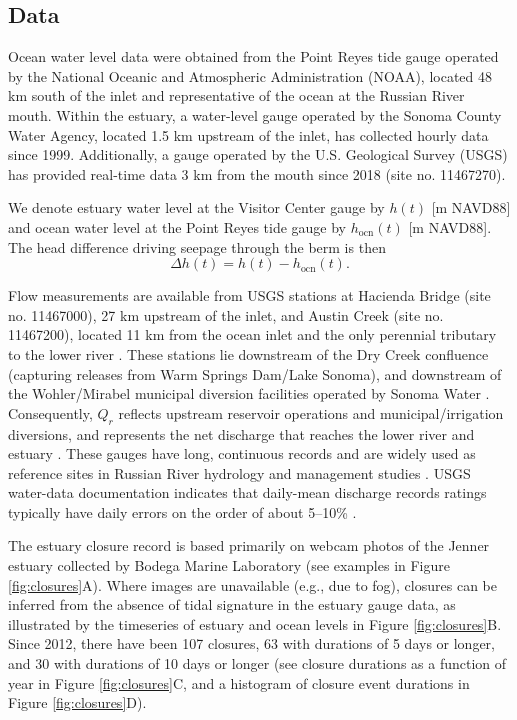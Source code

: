 \documentclass[preprint,12pt,authoryear]{elsarticle}
\begin{document}
\subsection{Data}

 Ocean water level data were obtained from the Point Reyes tide gauge operated by the National Oceanic and Atmospheric Administration (NOAA), located 48 km south of the inlet and representative of the ocean at the Russian River mouth. Within the estuary, a water-level gauge operated by the Sonoma County Water Agency, located 1.5 km upstream of the inlet, has collected hourly data  since 1999.
Additionally, a gauge operated by the U.S. Geological Survey (USGS) has provided real-time data 3 km from the mouth since 2018 (site no. 11467270).

We denote estuary water level at the Visitor Center gauge by $h(t)$ [m NAVD88] and ocean water level at the Point Reyes tide gauge by $h_{\mathrm{ocn}}(t)$ [m NAVD88]. The head difference driving seepage through the berm is then
\[
\Delta h(t) = h(t) - h_{\mathrm{ocn}}(t).
\]

Flow measurements are available from USGS stations at Hacienda Bridge (site no. 11467000), 27 km upstream of the inlet, and Austin Creek (site no. 11467200), located 11 km from the ocean inlet and the only perennial tributary to the lower river \citep{usgs_nwis_sw}.
These stations lie downstream of the Dry Creek confluence (capturing releases from Warm Springs Dam/Lake Sonoma), and downstream of the Wohler/Mirabel municipal diversion facilities operated by Sonoma Water \citep{sonomawater_watersupply}.  Consequently, $Q_r$  reflects upstream reservoir operations and municipal/irrigation diversions, and represents the net discharge that reaches the lower river and estuary \citep{SonomaWater_FishFlowDEIR_2016}.
These gauges have long, continuous records and are widely used as reference sites in Russian River hydrology and management studies \citep[e.g.,][]{anders2011water,newcomer2023prolonged}.
USGS water-data documentation indicates that daily-mean discharge records ratings typically have daily errors on the order of about 5--10\% \citep{USGS_WDR_Documentation_Explanation, Rantz1982_streamflow}.

The  estuary closure record is based primarily on webcam photos of the Jenner estuary collected by Bodega Marine Laboratory (see examples in Figure \ref{fig:closures}A).  Where images are unavailable (e.g., due to fog), closures can be inferred from the absence of tidal signature in the estuary gauge data, as illustrated by the timeseries of estuary and ocean levels  in Figure \ref{fig:closures}B.
Since 2012, there have been 107 closures, 63 with durations of 5 days or longer, and 30 with durations of 10 days or longer (see closure durations as a function of year in Figure \ref{fig:closures}C, and a histogram of closure event durations in Figure \ref{fig:closures}D).
\end{document}
